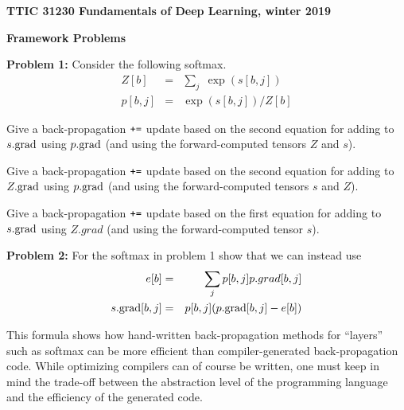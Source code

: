 \documentclass{article}
\begin{document}
\centerline{\bf TTIC 31230 Fundamentals of Deep Learning, winter 2019}
\centerline{\bf Framework Problems}

\bigskip
{\bf Problem 1:} Consider the following softmax.
\begin{eqnarray*}
  Z[b] & = & \sum_j\;\exp(s[b,j]) \\
  p[b,j] & = & \exp(s[b,j])/Z[b]
\end{eqnarray*}

Give a back-propagation $\mbox{\tt +=}$ update based on the second equation for adding to $s.\mathrm{grad}$ using $p.\mathrm{grad}$
(and using the forward-computed tensors $Z$ and $s$).

\medskip
Give a back-propagation $\mbox{\tt +=}$ update based on the second equation for adding to $Z.\mathrm{grad}$ using $p.\mathrm{grad}$
(and using the forward-computed tensors $s$ and $Z$).

\medskip
Give a back-propagation $\mbox{\tt +=}$ update based on the first equation for adding to $s.\mathrm{grad}$ using $Z.grad$
(and using the forward-computed tensor $s$).

\bigskip
{\bf Problem 2:} For the softmax in problem 1 show that we can instead use
\begin{eqnarray*}
  e[b] & = & \sum_j p[b,j]p.grad[b,j] \\
  s.\mathrm{grad}[b,j] & = & p[b,j](p.\mathrm{grad}[b,j] - e[b])
\end{eqnarray*}

This formula shows how hand-written back-propagation methods for ``layers'' such as softmax
can be more efficient than compiler-generated back-propagation code.
While optimizing compilers can of course be written, one must keep in mind the trade-off
between the abstraction level of the programming language and the efficiency of the generated code.
\end{document}
